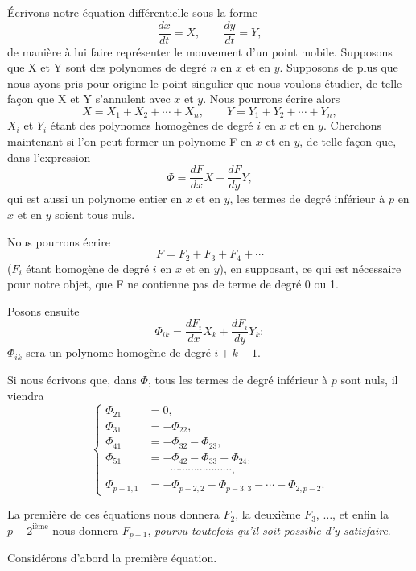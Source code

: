 \documentclass[11pt]{article}
\begin{document}
Écrivons notre équation différentielle sous la forme
\[
\frac{dx}{dt}=X,\qquad \frac{dy}{dt}=Y,
\]
de manière à lui faire représenter le mouvement d’un point mobile. Supposons que X et Y sont des polynomes de degré $n$ en $x$ et en $y$. Supposons de plus que nous ayons pris pour origine le point singulier que nous voulons étudier, de telle façon que X et Y s’annulent avec $x$ et $y$. Nous pourrons écrire alors
\[
X=X_1+X_2+\cdots+X_n,
\qquad
Y=Y_1+Y_2+\cdots+Y_n,
\]
$X_i$ et $Y_i$ étant des polynomes homogènes de degré $i$ en $x$ et en $y$. Cherchons maintenant si l’on peut former un polynome F en $x$ et en $y$, de telle façon que, dans l’expression
\[
\Phi=\frac{dF}{dx}X+\frac{dF}{dy}Y,
\]
qui est aussi un polynome entier en $x$ et en $y$, les termes de degré inférieur à $p$ en $x$ et en $y$ soient tous nuls.

Nous pourrons écrire
\[
F=F_2+F_3+F_4+\cdots
\]
($F_i$ étant homogène de degré $i$ en $x$ et en $y$), en supposant, ce qui est nécessaire pour notre objet, que F ne contienne pas de terme de degré 0 ou 1.

Posons ensuite
\[
\Phi_{ik}=\frac{dF_i}{dx}X_k+\frac{dF_i}{dy}Y_k;
\]
$
\Phi_{ik}
$ sera un polynome homogène de degré $i+k-1$.

Si nous écrivons que, dans $\Phi$, tous les termes de degré inférieur à $p$ sont nuls, il viendra
\begin{equation}\tag{1}
\left\{
\begin{aligned}
\Phi_{21}&=0,\\
\Phi_{31}&=-\Phi_{22},\\
\Phi_{41}&=-\Phi_{32}-\Phi_{23},\\
\Phi_{51}&=-\Phi_{42}-\Phi_{33}-\Phi_{24},\\
&\hspace{2em}\cdots\cdots\cdots\cdots\cdots\cdots\cdots,\\
\Phi_{p-1,1}&=-\Phi_{p-2,2}-\Phi_{p-3,3}-\cdots-\Phi_{2,p-2}.
\end{aligned}
\right.
\end{equation}

La première de ces équations nous donnera $F_2$, la deuxième $F_3$, $\ldots$, et enfin la $p-2^{\text{ième}}$ nous donnera $F_{p-1}$, \emph{pourvu toutefois qu’il soit possible d’y satisfaire}.

Considérons d’abord la première équation.
\end{document}
